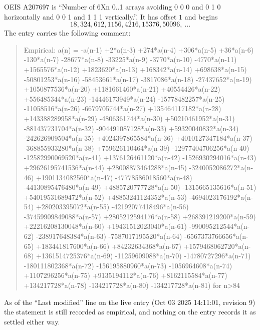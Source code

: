 \documentclass[11pt,a4paper]{article}
\theoremstyle{plain}
\theoremstyle{definition}
\begin{document}
OEIS A207697 is ``Number of 6Xn 0..1 arrays avoiding 0 0 0 and 0 1 0 horizontally and 0 0 1 and 1 1 1 vertically.''. It has offset
$1$ and begins
\[
18, 324, 612, 1156, 4216, 15376, 50096,\ \dots
\]
The entry carries the following comment:
\begin{quote}\small
Empirical: a(n) = -a(n-1) +2*a(n-3) +274*a(n-4) +306*a(n-5) +36*a(n-6) -130*a(n-7) -28677*a(n-8) -33225*a(n-9) -3770*a(n-10) -4770*a(n-11) +1565576*a(n-12) +1823620*a(n-13) +168342*a(n-14) +698638*a(n-15) -50801253*a(n-16) -58453661*a(n-17) -3817086*a(n-18) -27437652*a(n-19) +1050877536*a(n-20) +1181661460*a(n-21) +40554426*a(n-22) +556485344*a(n-23) -14446173949*a(n-24) -15778482257*a(n-25) -11058516*a(n-26) -6679705744*a(n-27) +135464117182*a(n-28) +143388289958*a(n-29) -4806361744*a(n-30) +50210461952*a(n-31) -881437731704*a(n-32) -904491087128*a(n-33) +59320040832*a(n-34) -242626909504*a(n-35) +4024397865584*a(n-36) +4010127347184*a(n-37) -368855933280*a(n-38) +759626110464*a(n-39) -12977404706256*a(n-40) -12582990069520*a(n-41) +1376126461120*a(n-42) -1526930294016*a(n-43) +29626195741536*a(n-44) +28008873464288*a(n-45) -3240052086272*a(n-46) +1901134082560*a(n-47) -47778586018560*a(n-48) -44130895476480*a(n-49) +4885720777728*a(n-50) -1315665135616*a(n-51) +54019531689472*a(n-52) +48853241124352*a(n-53) -4694023176192*a(n-54) +280203395072*a(n-55) -42192077418496*a(n-56) -37459909849088*a(n-57) +2805212594176*a(n-58) +268391219200*a(n-59) +22216208130048*a(n-60) +19431512023040*a(n-61) -990095212544*a(n-62) -238917648384*a(n-63) -7587017195520*a(n-64) -6567373766656*a(n-65) +183441817600*a(n-66) +84232634368*a(n-67) +1579468062720*a(n-68) +1361514725376*a(n-69) -11259609088*a(n-70) -14780727296*a(n-71) -180111802368*a(n-72) -156195880960*a(n-73) -1056964608*a(n-74) +1107296256*a(n-75) +9135194112*a(n-76) +8162115584*a(n-77) +134217728*a(n-78) -134217728*a(n-80) -134217728*a(n-81) for n>84
\end{quote}
As of the ``Last modified'' line on the live entry (Oct 03 2025 14:11:01, revision
9) the statement is still recorded as empirical, and nothing on the entry
records it as settled either way.
\end{document}
